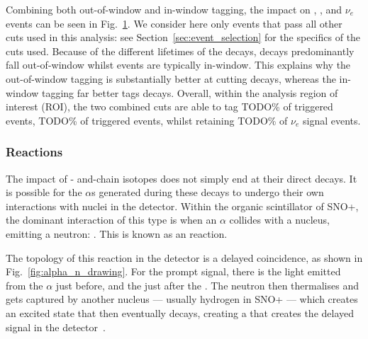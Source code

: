 Combining both out-of-window and in-window  tagging, the impact on , , and \beight{} $\nu_e$ events can be seen in Fig.~\ref{fig:bipo_tagging_efficiency}. We consider here only events that pass all other cuts used in this analysis: see Section~\ref{sec:event_selection} %
for the specifics of the cuts used. Because of the different lifetimes of the decays,  decays predominantly fall out-of-window whilst  events are typically in-window. This explains why the out-of-window tagging is substantially better at cutting  decays, whereas the in-window tagging far better tags  decays. Overall, within the analysis region of interest (ROI), the two combined cuts are able to tag TODO\% %
of  triggered events, TODO\% %
of  triggered events, whilst retaining TODO\% %
of \beight{} $\nu_e$ signal events.

\begin{figure}
    \centering
    \caption[]{}
    \label{fig:bipo_tagging_efficiency}
\end{figure}

\subsubsection{\alphan{} Reactions}
The impact of - and-chain isotopes does not simply end at their direct decays. It is possible for the $\alpha$s generated during these decays to undergo their own interactions with nuclei in the detector. Within the organic scintillator of SNO+, the dominant interaction of this type is when an $\alpha$ collides with a  nucleus, emitting a neutron: . This is known as an \alphan{} reaction.

The topology of this reaction in the detector is a delayed coincidence, as shown in Fig.~\ref{fig:alpha_n_drawing}. %
For the prompt signal, there is the light emitted from the $\alpha$ just before, and the  just after the \alphan{}. The neutron then thermalises and gets captured by another nucleus --- usually hydrogen in SNO+ --- which creates an excited state that then eventually decays, creating a \ce{\gamma} that creates the delayed signal in the detector~\cite{}. %

